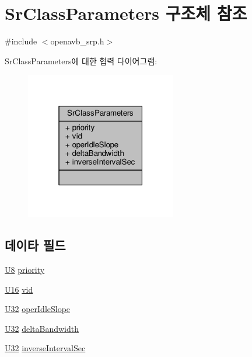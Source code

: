 \hypertarget{struct_sr_class_parameters}{}\section{Sr\+Class\+Parameters 구조체 참조}
\label{struct_sr_class_parameters}


{\ttfamily \#include $<$openavb\+\_\+srp.\+h$>$}



Sr\+Class\+Parameters에 대한 협력 다이어그램\+:
\nopagebreak
\begin{figure}[H]
\begin{center}
\leavevmode
\includegraphics[width=187pt]{struct_sr_class_parameters__coll__graph}
\end{center}
\end{figure}
\subsection*{데이타 필드}
\begin{DoxyCompactItemize}
\item 
\hyperlink{openavb__types__base__pub_8h_aa63ef7b996d5487ce35a5a66601f3e73}{U8} \hyperlink{struct_sr_class_parameters_a311f8b040417772c36534cb9ba9612d5}{priority}
\item 
\hyperlink{openavb__types__base__pub_8h_a0a0a322d5fa4a546d293a77ba8b4a71f}{U16} \hyperlink{struct_sr_class_parameters_a81f2d356205ff6eadadbb549b089018a}{vid}
\item 
\hyperlink{openavb__types__base__pub_8h_a696390429f2f3b644bde8d0322a24124}{U32} \hyperlink{struct_sr_class_parameters_a210b5d445110b98975edd37c37f2b805}{oper\+Idle\+Slope}
\item 
\hyperlink{openavb__types__base__pub_8h_a696390429f2f3b644bde8d0322a24124}{U32} \hyperlink{struct_sr_class_parameters_a669359fff9505aab6aa9bed0088ffe4e}{delta\+Bandwidth}
\item 
\hyperlink{openavb__types__base__pub_8h_a696390429f2f3b644bde8d0322a24124}{U32} \hyperlink{struct_sr_class_parameters_adb05f48bdf4e3c85f1c408e5ab95de5f}{inverse\+Interval\+Sec}
\end{DoxyCompactItemize}


